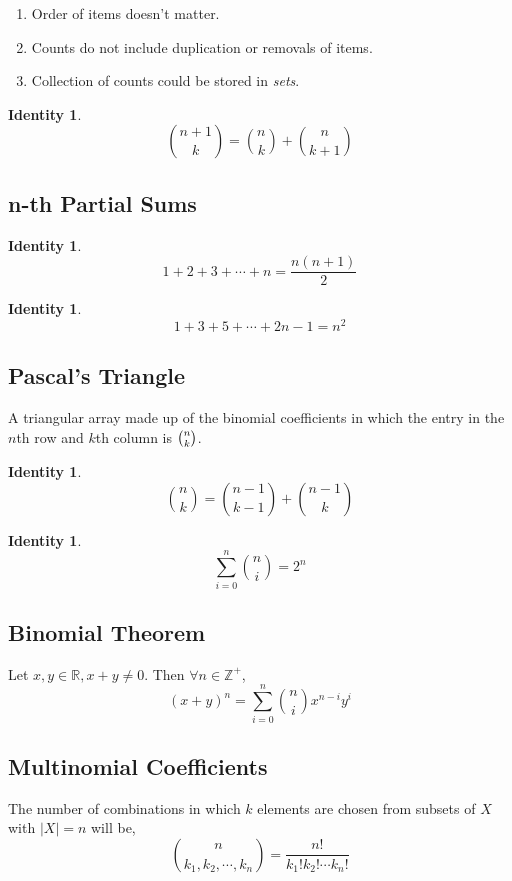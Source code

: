 \documentclass{article}
\newtheorem{identity}[theorem]{Identity}
\begin{document}
\begin{enumerate}
    \item Order of items doesn't matter. 
    \item Counts do not include duplication or removals of items.
    \item Collection of counts could be stored in \emph{sets}.
\end{enumerate} 

\begin{identity}
\[
    \binom{n+1}{k} = \binom{n}{k} + \binom{n}{k+1}
\]
\end{identity}

\subsection{n-th Partial Sums}
\begin{identity}
\[
    1 +2 +3 + \cdots + n =  \frac{n(n+1)}{2} 
\]
\end{identity}
\begin{identity}
\[
    1 +3 + 5 + \cdots + 2n -1 = n^2
\]
\end{identity}

\subsection{Pascal's Triangle}
A triangular array made up of the binomial coefficients in which the entry in the $n$th row and $k$th column is ${\tbinom {n}{k}}$.

\begin{identity}
\[
    \binom{n}{k} = \binom{n-1}{k-1} + \binom{n-1}{k}
\]
\end{identity}

\begin{identity}
\[
    \sum_{i=0}^n \binom{n}{i} = 2^n
\]
\end{identity}

\subsection{Binomial Theorem}
Let $x,y \in \mathbb R, x+y \neq 0$. Then $\forall n \in \mathbb Z^{+}$,
\[
    (x + y)^n = \sum_{i=0}^n \binom{n}{i} x^{n-i} y^i
\]

\subsection{Multinomial Coefficients}
The number of combinations in which $k$ elements are chosen from subsets of $X$ with $|X| = n$ will be,
\[
    \binom{n}{k_1, k_2, \cdots, k_n} = \frac{n!}{k_1! k_2! \cdots k_n!}
\]
\end{document}
